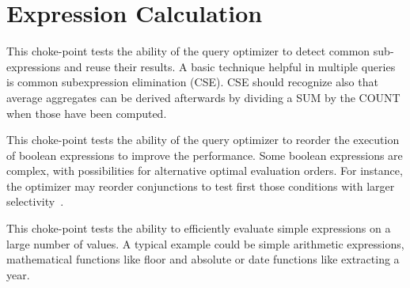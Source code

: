 
\section{Expression Calculation}


This choke-point tests the ability of the query optimizer to detect common sub-expressions and reuse their results. A basic technique helpful in multiple queries is common subexpression elimination (CSE).
CSE should recognize also that average aggregates can be derived afterwards by dividing a SUM by the COUNT when those have been computed.




This choke-point tests the ability of the query optimizer to reorder the execution of boolean expressions to improve the performance. Some boolean expressions are complex, with possibilities for alternative optimal evaluation orders.
For instance, the optimizer may reorder conjunctions to test first those conditions with larger selectivity~\cite{DBLP:conf/vldb/Moerkotte98}.




This choke-point tests the ability to efficiently evaluate simple expressions on a large number of values. A typical example could be simple arithmetic expressions, mathematical functions like floor and absolute or date functions like extracting a year.




%


